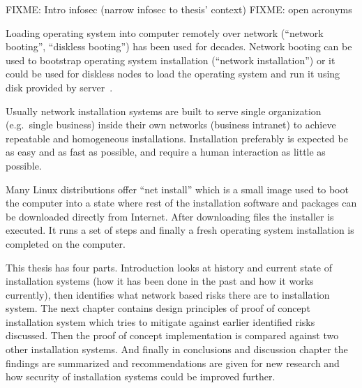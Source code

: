 
\iffalse
FIXME: TODO REMOVE THIS LIST
\begin{itemize}
\item INTRODUCTION: The Setting - bird eye's view - the challenge to be tackled / thing to be be improved in general
\item INTRODUCTION: Past research done
\item INTRODUCTION: Gap in knowledge/problem not yet solved
\item INTRODUCTION: Purpose and method of this work
\item INTRODUCTION: More detailed description what was done
\item INTRODUCTION: Results acquired
\item INTRODUCTION: Analysis and limitations of the result (Mostly relocate to Conclusions)
\item INTRODUCTION: Value (Mostly relocate to Conclusions)
\end{itemize}
\fi

FIXME: Intro infosec (narrow infosec to thesis' context)
FIXME: open acronyms

Loading operating system into computer remotely over network
(``network booting'', ``diskless booting'') has been used for
decades. Network booting can be used to bootstrap operating system
installation (``network installation'') or it could be used for
diskless nodes to load the operating system and run it using disk
provided by server~\cite{anvin2008x86}.

Usually network installation systems are built to serve single
organization (e.g.\ single business) inside their own networks
(business intranet) to achieve repeatable and homogeneous
installations. Installation preferably is expected be as easy and as
fast as possible, and require a human interaction as little as
possible.

Many Linux distributions offer ``net install'' which is a small image
used to boot the computer into a state where rest of the installation
software and packages can be downloaded directly from Internet. After
downloading files the installer is executed. It runs a set of steps
and finally a fresh operating system installation is completed on the
computer.

This thesis has four parts. Introduction looks at history and current
state of installation systems (how it has been done in the past and
how it works currently), then identifies what network based risks
there are to installation system. The next chapter contains design
principles of proof of concept installation system which tries to
mitigate against earlier identified risks discussed. Then the proof of
concept implementation is compared against two other installation
systems. And finally in conclusions and discussion chapter the
findings are summarized and recommendations are given for new research
and how security of installation systems could be improved further.

